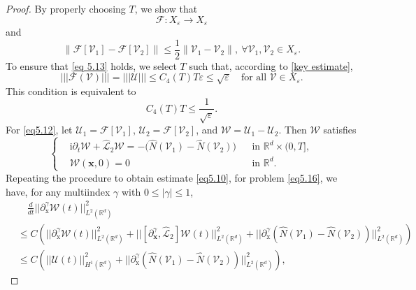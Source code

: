 \documentclass[11pt,reqno,oneside]{amsart}
\numberwithin{equation}{section}
\theoremstyle{definition}
\theoremstyle{remark}
\numberwithin{equation}{section}
\begin{document}
\begin{proof}
		By properly choosing $T$, we show that 
		\begin{equation}\label{eq 5.13}
			\mathscr{F}: X_\varepsilon \to X_\varepsilon
		\end{equation}
		and 
		\begin{equation}\label{eq5.12}
			\|\mathscr{F}[\mathscr{V}_1]-\mathscr{F}[\mathscr{V}_2]\|\leqslant \frac{1}{2}\|\mathscr{V}_1-\mathscr{V}_2\|, \ \forall \mathscr{V}_1,\mathscr{V}_2 \in X_\varepsilon. 
		\end{equation}
	To ensure that \eqref{eq 5.13} holds, we select \(T\) such that, according to \eqref{key estimate}, 
	\[
	|||\mathscr{F}(\mathscr{V})||| = |||\mathscr{U}||| \leqslant C_4(T)T\varepsilon \leqslant \sqrt{\varepsilon}
	\quad \text{for all } \mathscr{V} \in X_{\varepsilon}.
	\]
	This condition is equivalent to
	\begin{equation}\label{eq:5.13}
		C_4(T) T \leqslant \frac{1}{\sqrt{\varepsilon}}.
	\end{equation}
		For \eqref{eq5.12}, let \(\mathscr{U}_1 = \mathscr{F}[\mathscr{V}_1]\), \(\mathscr{U}_2 = \mathscr{F}[\mathscr{V}_2]\), and \(\mathscr{W} = \mathscr{U}_1 - \mathscr{U}_2\). Then \(\mathscr{W}\) satisfies
		\begin{equation}\label{eq5.16}
			\left\{
			\begin{aligned}
				&\mathrm{i}\partial_t \mathscr{W}+\hat{\mathcal{L}}_2\mathscr{W}=  -\big(\hat{N}(\mathscr{V}_1)-\hat{N}(\mathscr{V}_2)\big) && \text{in } \mathbb{R}^d \times (0,T], \\
				&\mathscr{W}(\mathbf{x},0) = 0&& \text{in } \mathbb{R}^d.
			\end{aligned}
			\right.
		\end{equation} 
		Repeating the procedure to obtain estimate \eqref{eq5.10}, for problem \eqref{eq5.16}, we have, for any multiindex $\gamma$ with $0\leqslant|\gamma|\leqslant 1$,
		\begin{equation}\label{eq 5.17}
				\begin{aligned}
				&\quad\frac{d}{dt}||\partial^{\gamma}_{\mathrm{x}}\mathscr{W}(t)||^2_{L^{2}(\mathbb{R}^d)} 
				\\&\leqslant C\left(|| \partial^{\gamma}_{\mathrm{x}}\mathscr{W}(t)||^{2}_{L^{2}(\mathbb{R}^d)}+|| [\partial_\mathbf{x}^\gamma,\hat{\mathcal{L}}_2]\mathscr{W}(t)||^{2}_{L^{2}(\mathbb{R}^d)}+||\partial^{\gamma}_{\mathrm{x}}(\hat{N}(\mathscr{V}_1)-\hat{N}(\mathscr{V}_2))||^{2}_{L^{2}(\mathbb{R}^d)}\right)\\
				&\leqslant C \left(|| \mathscr{U}(t)||^{2}_{H^{1}(\mathbb{R}^d)}+||\partial^{\gamma}_{\mathrm{x}}(\hat{N}(\mathscr{V}_1)-\hat{N}(\mathscr{V}_2))||^{2}_{L^{2}(\mathbb{R}^d)}\right),

\end{aligned}
\end{equation}
\end{proof}
\end{document}
